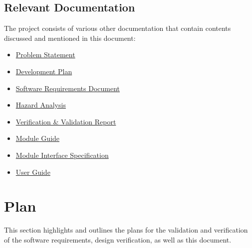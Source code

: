 \documentclass[12pt, titlepage]{article}
\begin{document}
\subsection{Relevant Documentation}
The project consists of various other documentation that contain contents discussed and mentioned in this document:
\begin{itemize}
    \item \href{https://github.com/brandonduong/Farming-Matters/blob/main/docs/ProblemStatementAndGoals/ProblemStatement.pdf}{Problem Statement}
    \item \href{https://github.com/brandonduong/Farming-Matters/blob/main/docs/ProblemStatementAndGoals/ProblemStatement.pdf}{Development Plan}
    \item \href{https://github.com/brandonduong/Farming-Matters/blob/main/docs/DevelopmentPlan/DevelopmentPlan.pdf}{Software Requirements Document}
    \item \href{https://github.com/brandonduong/Farming-Matters/blob/main/docs/HazardAnalysis/HazardAnalysis.pdf}{Hazard Analysis}
    \item \href{https://github.com/brandonduong/Farming-Matters/blob/main/docs/VnVReport/VnVReport.pdf}{Verification \&  Validation Report}
    \item \href{https://github.com/brandonduong/Farming-Matters/blob/main/docs/Design/MG/MG.pdf}{Module Guide}
    \item \href{https://github.com/brandonduong/Farming-Matters/blob/main/docs/Design/MIS/MIS.pdf}{Module Interface Specification}
    \item \href{https://github.com/brandonduong/Farming-Matters/blob/main/docs/UserGuide/UserGuide.pdf}{User Guide}
\end{itemize}



\section{Plan}
This section highlights and outlines the plans for the validation and verification of the software requirements, design verification, as well as this document. 
\end{document}

